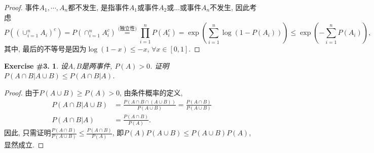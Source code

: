 \documentclass[UTF8, a4paper]{article}
\newtheorem{exercise}{Exercise \#3.}
\begin{document}
\begin{proof}
事件\(A_1, \cdots, A_n\)都不发生, 是指事件\(A_1\)或事件\(A_2\)或...或事件\(A_n\)不发生, 因此考虑
$$
P\left((\cup_{i = 1}^n A_i)^c\right) = P\left(\cap_{i = 1}^n A_i^c\right) \overset{\text{(独立性)}}{=} \prod_{i = 1}^n P(A_i^c) = \exp\left(\sum_{i = 1}^n \log(1 - P(A_i))\right) \leq \exp\left(-\sum_{i = 1}^n P(A_i)\right),
$$
其中, 最后的不等号是因为\(\log(1 - x) \leq -x\), \(\forall x \in [0, 1]\).
\end{proof}






\begin{framed}
\begin{exercise}
    设\(A, B\)是两事件, \(P(A) > 0\). 证明\(P(A \cap B | A\cup B) \leq P(A\cap B | A)\).
\end{exercise}
\end{framed}


\begin{proof}
    由于\(P(A\cup B) \geq P(A) >0\), 
    由条件概率的定义, 
    \begin{align*}
        P(A \cap B | A\cup B) &= \frac{P(A \cap B \cap (A\cup B))}{P(A\cup B)} = \frac{P(A \cap B)}{P(A\cup B)} \\
        P(A \cap B | A) &= \frac{P(A \cap B)}{P(A)}.
    \end{align*}
    因此, 只需证明\(\frac{P(A \cap B)}{P(A\cup B)} \leq \frac{P(A \cap B)}{P(A)}\), 即\(P(A)P(A\cup B) \leq P(A\cup B)P(A)\), 显然成立.
\end{proof}
\end{document}
